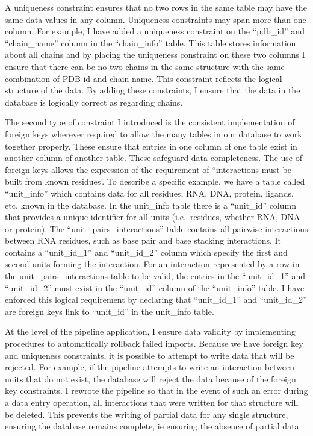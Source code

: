 A uniqueness constraint ensures that no two rows in the same table may have the
same data values in any column. Uniqueness constraints may span more than one
column. For example, I have added a uniqueness constraint on the ``pdb\_id'' and
``chain\_name'' column in the ``chain\_info'' table. This table stores information
about all chains and by placing the uniqueness constraint on these two columns I
ensure that there can be no two chains in the same structure with the same
combination of PDB id and chain name. This constraint reflects the logical
structure of the data. By adding these constraints, I ensure that the data in
the database is logically correct as regarding chains.

The second type of constraint I introduced is the consistent implementation of
foreign keys wherever required to allow the many tables in our database to work
together properly. These ensure that entries in one column of one table exist in
another column of another table. These safeguard data completeness. The use of
foreign keys allows the expression of the requirement of ``interactions must be
built from known residues'. To describe a specific example, we have a table
called ``unit\_info'' which contains data for all residues, RNA, DNA, protein,
ligands, etc, known in the database. In the unit\_info table there is a
``unit\_id'' column that provides a unique identifier for all units (i.e.\ 
residues, whether RNA, DNA or protein). The ``unit\_pairs\_interactions'' table
contains all pairwise interactions between RNA residues, such as base pair and
base stacking interactions. It contains a ``unit\_id\_1'' and ``unit\_id\_2'' column
which specify the first and second units forming the interaction. For an
interaction represented by a row in the unit\_pairs\_interactions table to be
valid, the entries in the ``unit\_id\_1'' and ``unit\_id\_2'' must exist  in the
``unit\_id'' column of the ``unit\_info'' table. I have enforced this logical
requirement by declaring that ``unit\_id\_1'' and ``unit\_id\_2'' are foreign keys
link to ``unit\_id'' in the unit\_info table.

At the level of the pipeline application, I ensure data validity by implementing
procedures to automatically rollback failed imports. Because we have foreign key
and uniqueness constraints, it is possible to attempt to write data that will be
rejected. For example, if the pipeline attempts to write an interaction between
units that do not exist, the database will reject the data because of the
foreign key constraints. I rewrote the pipeline so that in the event of such an
error during a data entry operation, all interactions that were written for that
structure will be deleted. This prevents the writing of partial data for any
single structure, ensuring the database remains complete, ie ensuring the
absence of partial data.

